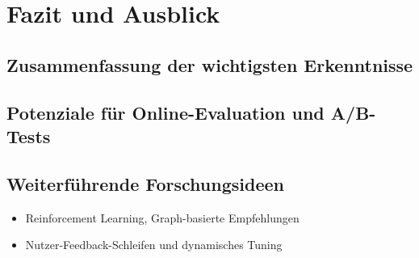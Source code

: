 \section{Fazit und Ausblick}
\subsection{Zusammenfassung der wichtigsten Erkenntnisse}
\subsection{Potenziale für Online-Evaluation und A/B-Tests}
\subsection{Weiterführende Forschungsideen}
\begin{itemize}
    \item Reinforcement Learning, Graph-basierte Empfehlungen
    \item Nutzer-Feedback-Schleifen und dynamisches Tuning
\end{itemize}